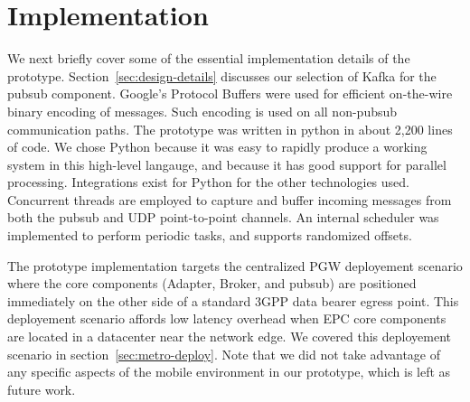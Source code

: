 \section{Implementation}

We next briefly cover some of the essential implementation details of
the \name{} prototype. Section~\ref{sec:design-details} discusses our
selection of Kafka for the pubsub component. Google's Protocol Buffers
were used for efficient on-the-wire binary encoding of messages. Such
encoding is used on all non-pubsub communication paths. The \name{} 
prototype was written in python in about 2,200 lines of code. We chose
Python because it was easy to rapidly produce a working system in this
high-level langauge, and because it has good support for parallel
processing. Integrations exist for Python for the other technologies
used. Concurrent threads are employed to capture and buffer incoming
messages from both the pubsub and UDP point-to-point channels. An
internal scheduler was implemented to perform periodic tasks, and
supports randomized offsets.

The prototype implementation targets the centralized PGW deployement
scenario where the core \name{} components (Adapter, Broker, and
pubsub) are positioned immediately on the other side of a standard
3GPP data bearer egress point. This deployement scenario affords low
latency overhead when EPC core components are located in a datacenter
near the network edge.  We covered this deployement scenario in
section~\ref{sec:metro-deploy}.  Note that we did not take advantage
of any specific aspects of the mobile environment in our prototype,
which is left as future work.
